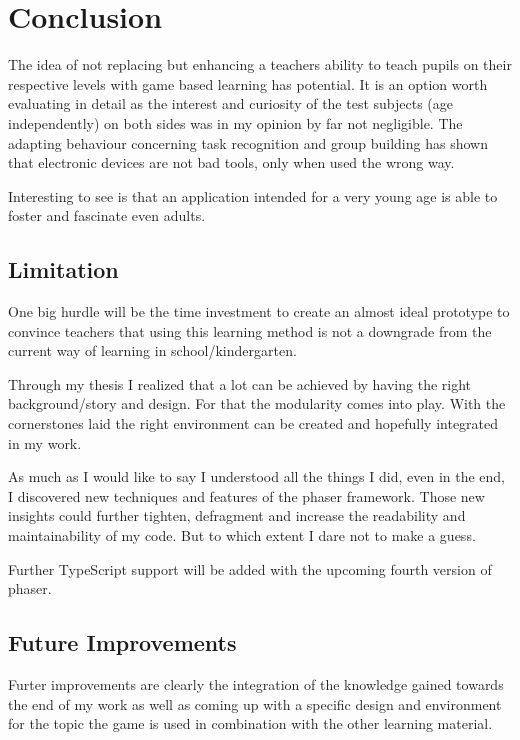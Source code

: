 
\chapter{Conclusion}\label{ch:conclusion}
The idea of not replacing but enhancing a teachers ability to teach pupils on their respective levels with
game based learning has potential. It is an option worth evaluating in detail as the interest and curiosity of
the test subjects (age independently) on both sides was in my opinion by far not negligible.
The adapting behaviour concerning task recognition and group building has shown that electronic
devices are not bad tools, only when used the wrong way.

Interesting to see is that an application intended for a very young age is able to foster and fascinate even adults.

\section{Limitation}
One big hurdle will be the time investment to create an almost ideal prototype to convince teachers that using this learning
method is not a downgrade from the current way of learning in school/kindergarten.

Through my thesis I realized that a lot can be achieved by having the right background/story and design.
For that the modularity comes into play.
With the cornerstones laid the right environment can be created and hopefully integrated in my work.

As much as I would like to say I understood all the things I did, even in the end, I discovered new techniques and features of
the phaser framework. Those new insights could further tighten, defragment and increase the readability and maintainability of my code.
But to which extent I dare not to make a guess.

Further TypeScript support will be added with the upcoming fourth version of phaser.

\section{Future Improvements}
Furter improvements are clearly the integration of the knowledge gained towards the end of my work as well as coming up
with a specific design and environment for the topic the game is used in combination with the other learning material.

